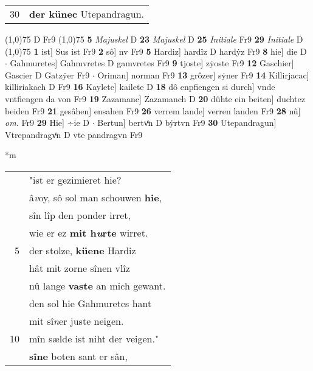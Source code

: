 \documentclass[8pt,a4paper,notitlepage]{article}
\begin{document}
\begin{table}[ht]
\begin{minipage}[t]{0.5\linewidth}
\begin{tabular}{rl}
30 & \textbf{der künec} Utepandragun.\\ 
\end{tabular}
\scriptsize
\line(1,0){75} \newline
D Fr9 \newline
\line(1,0){75} \newline
\textbf{5} \textit{Majuskel} D  \textbf{23} \textit{Majuskel} D  \textbf{25} \textit{Initiale} Fr9  \textbf{29} \textit{Initiale} D  \newline
\line(1,0){75} \newline
\textbf{1} ist] Sus ist Fr9 \textbf{2} sô] nv Fr9 \textbf{5} Hardiz] hardîz D hardẏz Fr9 \textbf{8} hie] die D  $\cdot$ Gahmuretes] Gahmvretes D gamvretes Fr9 \textbf{9} tjoste] zẏoste Fr9 \textbf{12} Gaschier] Gascier D Gatzẏer Fr9  $\cdot$ Oriman] norman Fr9 \textbf{13} grôzer] sẏner Fr9 \textbf{14} Killirjacac] killiriakach D Fr9 \textbf{16} Kaylete] kailete D \textbf{18} dô enpfiengen si durch] vnde vntfiengen da von Fr9 \textbf{19} Zazamanc] Zazamanch D \textbf{20} dûhte ein beiten] duchtez beiden Fr9 \textbf{21} gesâhen] ensahen Fr9 \textbf{26} verrem lande] verren landen Fr9 \textbf{28} nû] \textit{om.} Fr9 \textbf{29} Hie] ÷ie D  $\cdot$ Bertun] bertvͦn D bẏrtvn Fr9 \textbf{30} Utepandragun] Vtrepandragvͦn D vte pandragvn Fr9 \newline
\end{minipage}
\hspace{0.5cm}
\begin{minipage}[t]{0.5\linewidth}
\small
\begin{center}*m
\end{center}
\begin{tabular}{rl}
 & "ist er gezimieret hie?\\ 
 & â\textit{v}oy, sô sol man schouwen \textbf{hie},\\ 
 & sîn lîp den ponder irret,\\ 
 & wie er ez \textbf{mit h\textit{u}rte} wirret.\\ 
5 & der stolze, \textbf{küene} Hardiz\\ 
 & hât mit zorne sînen vlîz\\ 
 & nû lange \textbf{vaste} an mich gewant.\\ 
 & den sol hie Gahmuretes hant\\ 
 & mit sî\textit{n}er juste neigen.\\ 
10 & mîn sælde ist niht der veigen."\\ 
 & \textbf{sîne} boten sant er sân,\\ 

\end{tabular}
\end{minipage}
\end{table}
\end{document}
